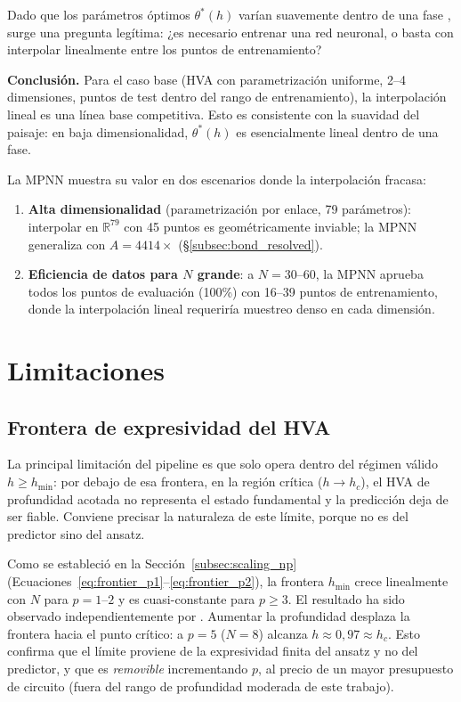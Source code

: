 \documentclass[11pt,a4paper,spanish]{book}
\begin{document}
Dado que los parámetros óptimos $\theta^*(h)$ varían suavemente dentro de una fase \citep{mele2022}, surge una pregunta legítima: ¿es necesario entrenar una red neuronal, o basta con interpolar linealmente entre los puntos de entrenamiento?

\textbf{Conclusión.} Para el caso base (HVA con parametrización uniforme, 2--4 dimensiones, puntos de test dentro del rango de entrenamiento), la interpolación lineal es una línea base competitiva. Esto es consistente con la suavidad del paisaje: en baja dimensionalidad, $\theta^*(h)$ es esencialmente lineal dentro de una fase.

La MPNN muestra su valor en dos escenarios donde la interpolación fracasa:
\begin{enumerate}
    \item \textbf{Alta dimensionalidad} (parametrización por enlace, 79 parámetros): interpolar en $\mathbb{R}^{79}$ con 45 puntos es geométricamente inviable; la MPNN generaliza con $A = 4414\times$ (§\ref{subsec:bond_resolved}).
    \item \textbf{Eficiencia de datos para $N$ grande}: a $N = 30$--$60$, la MPNN aprueba todos los puntos de evaluación (100\%) con 16--39 puntos de entrenamiento, donde la interpolación lineal requeriría muestreo denso en cada dimensión.
\end{enumerate}


\section{Limitaciones}
\label{sec:limitaciones}

\subsection{Frontera de expresividad del HVA}
\label{subsec:frontera_expresividad}

La principal limitación del pipeline es que solo opera dentro del régimen válido $h \geq h_{\min}$: por debajo de esa frontera, en la región crítica ($h \to h_c$), el HVA de profundidad acotada no representa el estado fundamental y la predicción deja de ser fiable. Conviene precisar la naturaleza de este límite, porque no es del predictor sino del ansatz.

Como se estableció en la Sección~\ref{subsec:scaling_np} (Ecuaciones~\ref{eq:frontier_p1}--\ref{eq:frontier_p2}), la frontera $h_{\min}$ crece linealmente con $N$ para $p = 1$--$2$ y es cuasi-constante para $p \geq 3$. El resultado ha sido observado independientemente por \citet{tripathi2026}. Aumentar la profundidad desplaza la frontera hacia el punto crítico: a $p = 5$ ($N = 8$) alcanza $h \approx 0,97 \approx h_c$. Esto confirma que el límite proviene de la expresividad finita del ansatz y no del predictor, y que es \emph{removible} incrementando $p$, al precio de un mayor presupuesto de circuito (fuera del rango de profundidad moderada de este trabajo).
\end{document}
